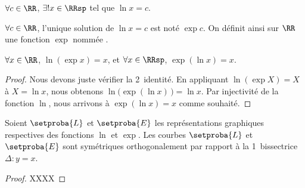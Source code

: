 \begin{fact}
	$\forall c \in \RR$,
	$\exists! x \in \RRsp$ tel que 
	$\ln x = c$.
\end{fact}




\begin{defi}
	$\forall c \in \RR$, 
	l'unique solution de $\ln x = c$ est noté $\exp c$.
	On définit ainsi sur $\RR$ une fonction $\exp$ nommée .
\end{defi}




\begin{fact}
	$\forall x \in \RR$, $\ln ( \exp x ) = x$,
	et
	$\forall x \in \RRsp$, $\exp ( \ln x ) = x$.
\end{fact}


\begin{proof}	
	Nous devons juste vérifier la 2\ieme\ identité.
	En appliquant $\ln ( \exp X ) = X$ à $X = \ln x$,
	nous obtenons $\ln \big( \exp ( \ln x ) \,\big) = \ln x$.
	Par injectivité de la fonction $\ln$, nous arrivons à $\exp ( \ln x ) = x$ comme souhaité.
\end{proof}




\begin{fact}
	Soient $\setproba{L}$ et $\setproba{E}$ les représentations graphiques respectives des fonctions $\ln$ et $\exp$.
	Les courbes $\setproba{L}$ et $\setproba{E}$ sont symétriques orthogonalement par rapport à la 1\iere\ bissectrice $\Delta: y = x$.
\end{fact}


\begin{proof}	
	XXXX
\end{proof}
